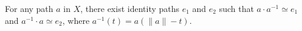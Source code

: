 For any path $a$ in $X$, there exist identity paths $e_1$ and $e_2$ such that $a \cdot a^{-1} \simeq e_1$ and $a^{-1} \cdot a \simeq e_2$, where $a^{-1}(t) = a(\|a\| - t)$.
